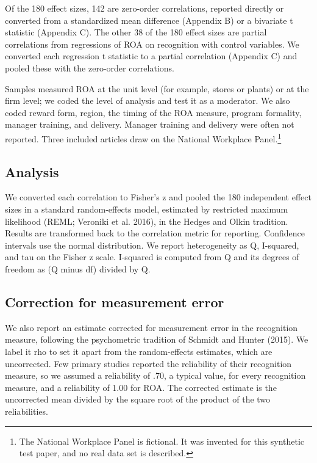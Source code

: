 \documentclass[11pt]{article}
\begin{document}
Of the 180 effect sizes, 142 are zero-order correlations, reported directly or converted from a standardized mean difference (Appendix B) or a bivariate t statistic (Appendix C). The other 38 of the 180 effect sizes are partial correlations from regressions of ROA on recognition with control variables. We converted each regression t statistic to a partial correlation (Appendix C) and pooled these with the zero-order correlations.

Samples measured ROA at the unit level (for example, stores or plants) or at the firm level; we coded the level of analysis and test it as a moderator. We also coded reward form, region, the timing of the ROA measure, program formality, manager training, and delivery. Manager training and delivery were often not reported. Three included articles draw on the National Workplace Panel.\footnote{The National Workplace Panel is fictional. It was invented for this synthetic test paper, and no real data set is described.}

\subsection{Analysis}

We converted each correlation to Fisher's z and pooled the 180 independent effect sizes in a standard random-effects model, estimated by restricted maximum likelihood (REML; Veroniki et al. 2016), in the Hedges and Olkin tradition. Results are transformed back to the correlation metric for reporting. Confidence intervals use the normal distribution. We report heterogeneity as Q, I-squared, and tau on the Fisher z scale. I-squared is computed from Q and its degrees of freedom as (Q minus df) divided by Q.

\subsection{Correction for measurement error}

We also report an estimate corrected for measurement error in the recognition measure, following the psychometric tradition of Schmidt and Hunter (2015). We label it rho to set it apart from the random-effects estimates, which are uncorrected. Few primary studies reported the reliability of their recognition measure, so we assumed a reliability of .70, a typical value, for every recognition measure, and a reliability of 1.00 for ROA. The corrected estimate is the uncorrected mean divided by the square root of the product of the two reliabilities.
\end{document}
